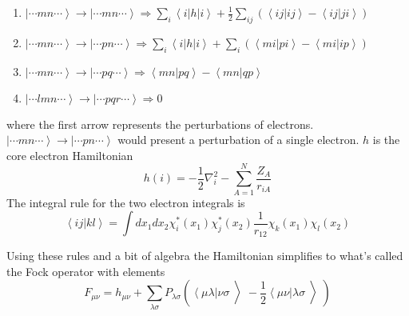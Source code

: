         \begin{enumerate}
        \item
          $ \left | \cdots mn \cdots \right > \rightarrow \left | \cdots mn
          \cdots \right > \Rightarrow \sum_i \left< i \right| h \left| i
          \right> + \frac{1}{2} \sum_{ij} \left( \left< ij | ij \right> - \left< ij | ji \right> \right) $
        \item
          $ \left | \cdots mn \cdots \right > \rightarrow \left | \cdots pn
          \cdots \right > \Rightarrow \sum_i \left< i \right| h \left| i \right> +
          \sum_{i} \left( \left<mi | pi \right> - \left<mi | ip \right> \right) $
        \item
          $ \left | \cdots mn \cdots \right > \rightarrow \left | \cdots pq
          \cdots \right > \Rightarrow \left< mn | pq \right> - \left< mn | qp \right> $
        \item
          $ \left | \cdots lmn \cdots \right > \rightarrow \left | \cdots pqr
          \cdots \right > \Rightarrow 0 $
        \end{enumerate}
        where the first arrow represents the perturbations of electrons. \(\left| \cdots mn \cdots \right> \rightarrow \left| \cdots pn \cdots \right>\) would present a perturbation of a single electron.
    \(h\) is the core electron Hamiltonian
\begin{equation}
h(i) = -\frac{1}{2}\nabla_i^2 - \sum_{A=1}^N \frac{Z_A}{r_{iA}}
\end{equation}
The integral rule for the two electron integrals is
\begin{equation}
\left< ij | kl \right> = \int dx_1 dx_2 \chi_i^*(x_1) \chi_j^*(x_2) \frac{1}{r_{12}} \chi_k(x_1) \chi_l(x_2)
\end{equation}

        Using these rules and a bit of algebra the Hamiltonian simplifies to
        what's called the Fock operator with elements
        \begin{equation}
          F_{\mu\nu} = h_{\mu\nu}
          + \sum_{\lambda \sigma} P_{\lambda \sigma}
          \left(
          \left< \mu \lambda \right| \nu \sigma \left>\right.
          - \frac{1}{2} \left< \mu \nu \right| \lambda \sigma \left>\right.
          \right)
        \end{equation}

